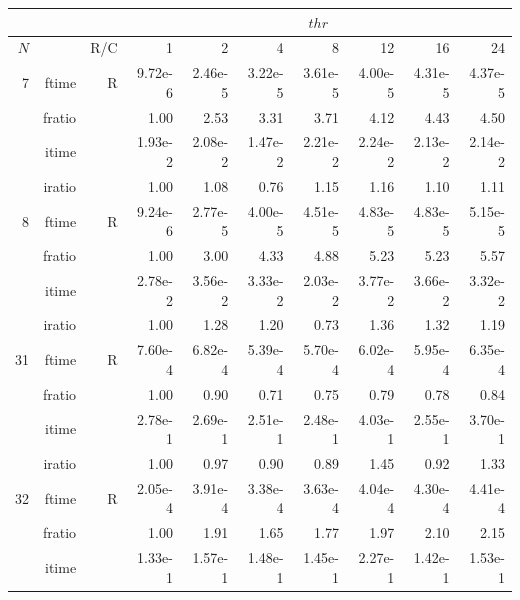 \documentclass[a4paper]{article}
\begin{document}
\begin{table}
\begin{center}
\begin{tabular}{|r|r|r|r|r|r|r|r|r|r|}
\hline 
     \multicolumn{3}{|c|}{ } & \multicolumn{7}{c|}{$thr$} \\ \hline
    $N$  & & R/C  & 1           & 2    & 4    & 8    & 12   & 16    & 24  \\ \hline\hline
    7  & ftime & R  &  9.72e-6 &   2.46e-5 &   3.22e-5 &   3.61e-5 &   4.00e-5 &   4.31e-5 &   4.37e-5     \\ 
    & fratio & &       1.00 &   2.53 &   3.31 &   3.71 &   4.12 &   4.43 &   4.50    \\ 
     & itime & &       1.93e-2 &   2.08e-2 &   1.47e-2 &   2.21e-2 &   2.24e-2 &   2.13e-2 &   2.14e-2        \\ 
     & iratio & &      1.00 &   1.08 &   0.76 &   1.15 &   1.16 &   1.10 &   1.11         \\ \hline 
    8  & ftime & R  &  9.24e-6 &   2.77e-5 &   4.00e-5 &   4.51e-5 &   4.83e-5 &   4.83e-5 &   5.15e-5     \\ 
      & fratio & &     1.00 &   3.00 &   4.33 &   4.88 &   5.23 &   5.23 &   5.57      \\ 
     & itime & &       2.78e-2 &   3.56e-2 &   3.33e-2 &   2.03e-2 &   3.77e-2 &   3.66e-2 &   3.32e-2        \\ 
     & iratio & &      1.00 &   1.28 &   1.20 &   0.73 &   1.36 &   1.32 &   1.19        \\ \hline 
   31  & ftime & R  &  7.60e-4 &   6.82e-4 &   5.39e-4 &   5.70e-4 &   6.02e-4 &   5.95e-4 &   6.35e-4    \\ 
      & fratio & &     1.00 &   0.90 &   0.71 &   0.75 &   0.79 &   0.78 &   0.84       \\ 
     & itime & &       2.78e-1 &   2.69e-1 &   2.51e-1 &   2.48e-1 &   4.03e-1 &   2.55e-1 &   3.70e-1       \\ 
     & iratio & &      1.00 &   0.97 &   0.90 &   0.89 &   1.45 &   0.92 &   1.33       \\ \hline 
   32  & ftime & R  &  2.05e-4 &   3.91e-4 &   3.38e-4 &   3.63e-4 &   4.04e-4 &   4.30e-4 &   4.41e-4    \\ 
      & fratio & &     1.00 &   1.91 &   1.65 &   1.77 &   1.97 &   2.10 &   2.15        \\ 
     & itime & &       1.33e-1 &   1.57e-1 &   1.48e-1 &   1.45e-1 &   2.27e-1 &   1.42e-1 &   1.53e-1        \\ 

\end{tabular}
\end{center}
\end{table}
\end{document}
